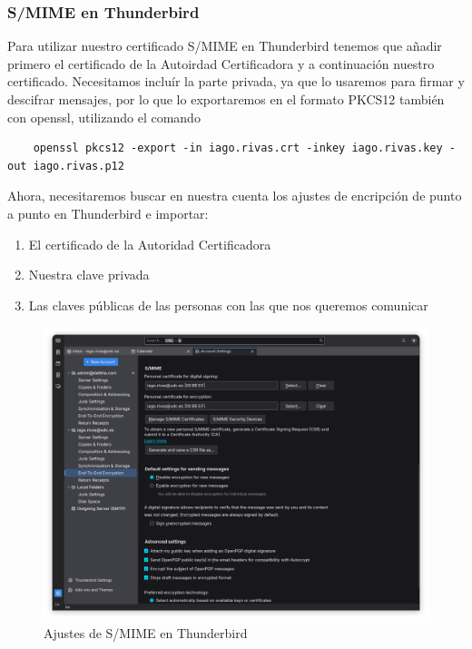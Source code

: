 \subsubsection{S/MIME en Thunderbird}

Para utilizar nuestro certificado S/MIME en Thunderbird tenemos que añadir primero el certificado de la Autoirdad Certificadora y a continuación nuestro certificado. Necesitamos incluír la parte privada, ya que lo usaremos para firmar y descifrar mensajes, por lo que lo exportaremos en el formato PKCS12 también con openssl, utilizando el comando

\begin{verbatim}
    openssl pkcs12 -export -in iago.rivas.crt -inkey iago.rivas.key -out iago.rivas.p12
\end{verbatim}

Ahora, necesitaremos buscar en nuestra cuenta los ajustes de encripción de punto a punto en Thunderbird e importar:
\begin{enumerate}
    \item El certificado de la Autoridad Certificadora
    \item Nuestra clave privada
    \item Las claves públicas de las personas con las que nos queremos comunicar
\end{enumerate}

\begin{figure}[H]
    \centering
    \includegraphics[width=\textwidth]{thunderbird-smime-configuracion.png}
    \caption{Ajustes de S/MIME en Thunderbird}
\end{figure}

